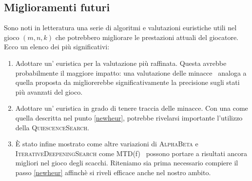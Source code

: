 \documentclass{article}
\begin{document}
\subsection*{Miglioramenti futuri}

Sono noti in letteratura una serie di algoritmi e valutazioni euristiche utili
nel gioco $(m, n, k)$ che potrebbero migliorare le prestazioni 
attuali del giocatore. Ecco un elenco dei pi\`u significativi:

\begin{enumerate}
  \item Adottare un' euristica per la valutazione pi\`u raffinata. Questa avrebbe 
    probabilmente il maggiore impatto: una valutazione delle minacce~\cite{heur}
    analoga a quella proposta da \citeauthor{heur} migliorerebbe significativamente
    la precisione sugli stati pi\`u avanzati del gioco. \label{newheur}
  \item Adottare un' euristica in grado di tenere traccia delle minacce. Con una come quella
    descritta nel punto \vref{newheur}, potrebbe rivelarsi importante l'utilizzo
    della \textsc{QuiescenceSearch}.
  \item \`E stato infine mostrato come altre variazioni di \textsc{AlphaBeta} e
    \textsc{IterativeDeepeningSearch} come MTD(f)~\cite{mtdf} possono portare a
    risultati ancora migliori nel gioco degli scacchi. Riteniamo sia prima
    necessario compiere il passo \vref{newheur} affinch\`e si riveli efficace anche nel nostro ambito.
\end{enumerate}



\end{document}
